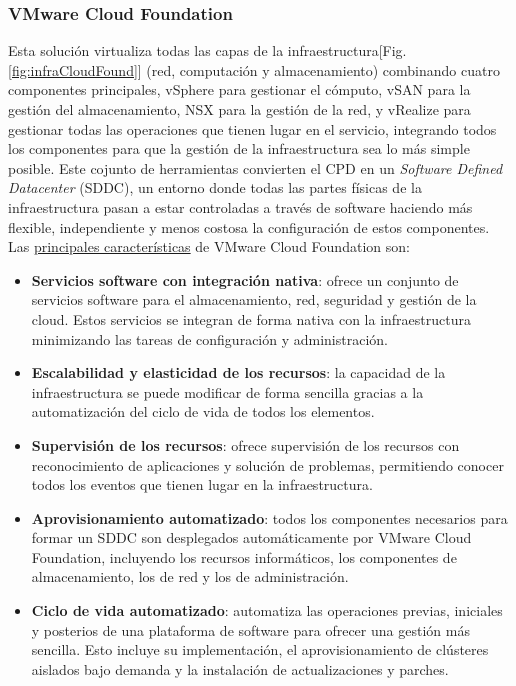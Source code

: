 \subsubsection{VMware Cloud Foundation}
Esta solución virtualiza todas las capas de la infraestructura[Fig. \ref{fig:infraCloudFound}] (red, computación y almacenamiento) combinando cuatro componentes principales, vSphere para gestionar el cómputo, vSAN para la gestión del almacenamiento, NSX para la gestión de la red, y vRealize para gestionar todas las operaciones que tienen lugar en el servicio, integrando todos los componentes para que la gestión de la infraestructura sea lo más simple posible. Este cojunto de herramientas convierten el CPD en un \textit{Software Defined Datacenter} (SDDC), un entorno donde todas las partes físicas de la infraestructura pasan a estar controladas a través de software haciendo más flexible, independiente y menos costosa la configuración de estos componentes. Las \underline{principales características} de VMware Cloud Foundation son:
\begin{itemize}
    \item \textbf{Servicios software con integración nativa}: ofrece un conjunto de servicios software para el almacenamiento, red, seguridad y gestión de la cloud. Estos servicios se integran de forma nativa con la infraestructura minimizando las tareas de configuración y administración.
    \item \textbf{Escalabilidad y elasticidad de los recursos}: la capacidad de la infraestructura se puede modificar de forma sencilla gracias a la automatización del ciclo de vida de todos los elementos. 
    \item \textbf{Supervisión de los recursos}: ofrece supervisión de los recursos con reconocimiento de aplicaciones y solución de problemas, permitiendo conocer todos los eventos que tienen lugar en la infraestructura.
    \item \textbf{Aprovisionamiento automatizado}: todos los componentes necesarios para formar un SDDC son desplegados automáticamente por VMware Cloud Foundation, incluyendo los recursos informáticos, los componentes de almacenamiento, los de red y los de administración.
    \item \textbf{Ciclo de vida automatizado}: automatiza las operaciones previas, iniciales y posterios de una plataforma de software para ofrecer una gestión más sencilla. Esto incluye su implementación, el aprovisionamiento de clústeres aislados bajo demanda y la instalación de actualizaciones y parches.
   

\end{itemize}

